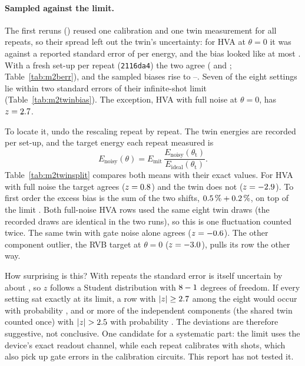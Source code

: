 \paragraph{Sampled against the limit.} The first reruns () reused one calibration and
one twin measurement for all repeats, so their spread left out the twin's uncertainty: for HVA
at $\theta=0$ it was \VMoHvaFullZeroRoSymTwinSpread{} against a reported standard error of
\VMoHvaFullZeroRoSymTwinSe{} per energy, and the bias looked like at most \VMoMaxRoSymTwin. With
a fresh set-up per repeat (\texttt{2116da4}) the two agree (\VMbHvaFullZeroRoSymTwinSpread{}
and \VMbHvaFullZeroRoSymTwinSe; Table~\ref{tab:m2berr}), and the sampled biases rise to
\VMbRoSymTwinMin{}--\VMbRoSymTwinMax. Seven of the eight settings lie within two standard errors
of their infinite-shot limit (Table~\ref{tab:m2twinbias}). The exception, HVA with full noise at
$\theta=0$, has $z=2.7$.

To locate it, undo the rescaling repeat by repeat. The twin energies are recorded per set-up,
and the target energy each repeat measured is
\[
  E_{\mathrm{noisy}}(\theta)=E_{\mathrm{mit}}\,\frac{E_{\mathrm{noisy}}(\theta_{\mathrm t})}{E_{\mathrm{ideal}}(\theta_{\mathrm t})} .
\] Table~\ref{tab:m2twinsplit} compares both means
with their exact values. For HVA with full noise the target agrees ($z=0.8$)
and the twin does not ($z=-2.9$). To first order the excess bias is the sum of
the two shifts, $0.5\,\%+0.2\,\%$, on top of the limit
\VMxTwHvaZeroFullCtfRel. Both full-noise HVA rows used the same eight twin draws (the recorded
draws are identical in the two runs), so this is one fluctuation counted twice. The same twin
with gate noise alone agrees ($z=-0.6$). The other component outlier, the RVB
target at $\theta=0$ ($z=-3.0$), pulls its row the other way.

How surprising is this? With \VMbRepeats{} repeats the standard error is itself uncertain by about
\VMbSpreadRelErr, so $z$ follows a Student distribution with $8-1$ degrees of freedom.
If every setting sat exactly at its limit, a row with $|z|\ge2.7$ among the eight
would occur with probability \VMbPRow, and \VMbCompOver{} or more of the \VMbCompN{} independent
components (the shared twin counted once) with $|z|>\VMbCompCut$ with probability \VMbPComp. The deviations are therefore suggestive, not
conclusive. One candidate for a systematic part: the limit uses the device's exact readout
channel, while each repeat calibrates with \VMbSetupRo{} shots, which also pick up gate errors
in the calibration circuits. This report has not tested it.

